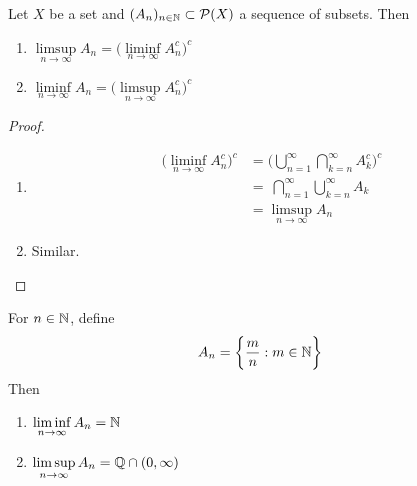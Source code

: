 \documentclass{book}
\begin{document}
	\begin{ex}  
		Let $X$ be a set and $(A_n)_{n \in \mathbb{N}} \subset \mathcal{P}(X)$ a sequence of subsets. Then 
		\begin{enumerate}
			\item $\limsup\limits_{n \rightarrow \infty}A_n = \bigg(\liminf\limits_{n \rightarrow \infty}A_n^c \bigg)^c$
			\item $\liminf\limits_{n \rightarrow \infty}A_n = \bigg(\limsup\limits_{n \rightarrow \infty}A_n^c \bigg)^c$
		\end{enumerate}
	\end{ex}
	
	\begin{proof}\
		\begin{enumerate}
			\item \begin{align*}
				\bigg( \liminf\limits_{n \rightarrow \infty}A_n^c \bigg)^c 
				&= \bigg( \bigcup\limits_{n=1}^{\infty} \bigcap\limits_{k=n}^{\infty}A_k^c \bigg)^c\\
				&= \ \bigcap\limits_{n=1}^{\infty}\bigcup\limits_{k=n}^{\infty}A_k  \\
				&=  \limsup\limits_{n \rightarrow \infty}A_n
			\end{align*}
			\item Similar.
		\end{enumerate}
	\end{proof}
	
	\begin{ex}  
		For $n \in \mathbb{N}$, define $$A_n = \bigg\{ \frac{m}{n}: m \in \mathbb{N} \bigg\}$$ 
		Then
		\begin{enumerate}
			\item $\liminf\limits_{n \rightarrow \infty }A_n = \mathbb{N}$ 
			\item $\limsup\limits_{n \rightarrow \infty }A_n = \mathbb{Q} \cap (0,\infty )$
		\end{enumerate}
	\end{ex}
	
\end{document}
